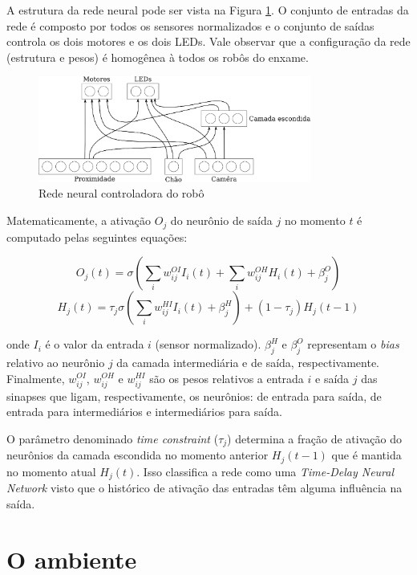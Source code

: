 A estrutura da rede neural pode ser vista na Figura \ref{fig:robot-ann}. O conjunto de entradas da rede é composto por todos os sensores normalizados e o conjunto de saídas controla os dois motores e os dois LEDs. Vale observar que a configuração da rede (estrutura e pesos) é homogênea à todos os robôs do enxame.

\begin{figure}[H]
    \centering
    \includegraphics[width=0.8\textwidth]{figures/robot-ann}
    \caption{Rede neural controladora do robô}
    \label{fig:robot-ann}
\end{figure}

Matematicamente, a ativação $O_{j}$ do neurônio de saída $j$ no momento $t$ é computado pelas seguintes equações:

$$
O_{j}(t) = \sigma (\sum_{i} w_{ij}^{OI} I_{i}(t) + \sum_{i} w_{ij}^{OH} H_{i}(t) + \beta_{j}^{O})
$$
$$
H_{j}(t) = \tau_{j} \sigma (\sum_{i} w_{ij}^{HI} I_{i}(t) + \beta_{j}^{H}) + (1 - \tau_{j}) H_{j} (t - 1)
$$

onde $I_{i}$ é o valor da entrada $i$ (sensor normalizado). $\beta_{j}^{H}$ e $\beta_{j}^{O}$  representam o \textit{bias} relativo ao neurônio $j$ da camada intermediária e de saída, respectivamente. Finalmente, $w_{ij}^{OI}$, $w_{ij}^{OH}$ e $w_{ij}^{HI}$ são os pesos relativos a entrada $i$ e saída $j$ das sinapses que ligam, respectivamente, os neurônios: de entrada para saída, de entrada para intermediários e intermediários para saída.

O parâmetro denominado \textit{time constraint} ($\tau_{j}$) determina a fração de ativação do neurônios da camada escondida no momento anterior $H_{j} (t - 1)$ que é mantida no momento atual $H_{j} (t)$. Isso classifica a rede como uma \textit{Time-Delay Neural Network} visto que o histórico de ativação das entradas têm alguma influência na saída.

\section{O ambiente}
\label{sec:environment}

